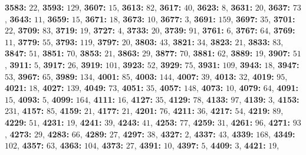 \textsf{\bfseries 3583:} $22$, \textsf{\bfseries 3593:} $129$, \textsf{\bfseries 3607:} $15$, \textsf{\bfseries 3613:} $82$, \textsf{\bfseries 3617:} $40$, \textsf{\bfseries 3623:} $8$, \textsf{\bfseries 3631:} $20$, \textsf{\bfseries 3637:} $73$, \textsf{\bfseries 3643:} $11$, \textsf{\bfseries 3659:} $15$, \textsf{\bfseries 3671:} $18$, \textsf{\bfseries 3673:} $10$, \textsf{\bfseries 3677:} $3$, \textsf{\bfseries 3691:} $159$, \textsf{\bfseries 3697:} $35$, \textsf{\bfseries 3701:} $22$, \textsf{\bfseries 3709:} $83$, \textsf{\bfseries 3719:} $19$, \textsf{\bfseries 3727:} $4$, \textsf{\bfseries 3733:} $20$, \textsf{\bfseries 3739:} $91$, \textsf{\bfseries 3761:} $6$, \textsf{\bfseries 3767:} $64$, \textsf{\bfseries 3769:} $11$, \textsf{\bfseries 3779:} $55$, \textsf{\bfseries 3793:} $119$, \textsf{\bfseries 3797:} $20$, \textsf{\bfseries 3803:} $43$, \textsf{\bfseries 3821:} $34$, \textsf{\bfseries 3823:} $21$, \textsf{\bfseries 3833:} $83$, \textsf{\bfseries 3847:} $51$, \textsf{\bfseries 3851:} $70$, \textsf{\bfseries 3853:} $21$, \textsf{\bfseries 3863:} $29$, \textsf{\bfseries 3877:} $70$, \textsf{\bfseries 3881:} $62$, \textsf{\bfseries 3889:} $19$, \textsf{\bfseries 3907:} $51$, \textsf{\bfseries 3911:} $5$, \textsf{\bfseries 3917:} $26$, \textsf{\bfseries 3919:} $101$, \textsf{\bfseries 3923:} $52$, \textsf{\bfseries 3929:} $75$, \textsf{\bfseries 3931:} $109$, \textsf{\bfseries 3943:} $18$, \textsf{\bfseries 3947:} $53$, \textsf{\bfseries 3967:} $65$, \textsf{\bfseries 3989:} $134$, \textsf{\bfseries 4001:} $85$, \textsf{\bfseries 4003:} $144$, \textsf{\bfseries 4007:} $39$, \textsf{\bfseries 4013:} $32$, \textsf{\bfseries 4019:} $95$, \textsf{\bfseries 4021:} $18$, \textsf{\bfseries 4027:} $139$, \textsf{\bfseries 4049:} $73$, \textsf{\bfseries 4051:} $35$, \textsf{\bfseries 4057:} $148$, \textsf{\bfseries 4073:} $10$, \textsf{\bfseries 4079:} $64$, \textsf{\bfseries 4091:} $15$, \textsf{\bfseries 4093:} $5$, \textsf{\bfseries 4099:} $164$, \textsf{\bfseries 4111:} $16$, \textsf{\bfseries 4127:} $35$, \textsf{\bfseries 4129:} $78$, \textsf{\bfseries 4133:} $97$, \textsf{\bfseries 4139:} $3$, \textsf{\bfseries 4153:} $231$, \textsf{\bfseries 4157:} $85$, \textsf{\bfseries 4159:} $21$, \textsf{\bfseries 4177:} $21$, \textsf{\bfseries 4201:} $76$, \textsf{\bfseries 4211:} $36$, \textsf{\bfseries 4217:} $54$, \textsf{\bfseries 4219:} $89$, \textsf{\bfseries 4229:} $51$, \textsf{\bfseries 4231:} $19$, \textsf{\bfseries 4241:} $39$, \textsf{\bfseries 4243:} $41$, \textsf{\bfseries 4253:} $77$, \textsf{\bfseries 4259:} $31$, \textsf{\bfseries 4261:} $96$, \textsf{\bfseries 4271:} $93$, \textsf{\bfseries 4273:} $29$, \textsf{\bfseries 4283:} $66$, \textsf{\bfseries 4289:} $27$, \textsf{\bfseries 4297:} $38$, \textsf{\bfseries 4327:} $2$, \textsf{\bfseries 4337:} $43$, \textsf{\bfseries 4339:} $168$, \textsf{\bfseries 4349:} $102$, \textsf{\bfseries 4357:} $63$, \textsf{\bfseries 4363:} $104$, \textsf{\bfseries 4373:} $27$, \textsf{\bfseries 4391:} $10$, \textsf{\bfseries 4397:} $5$, \textsf{\bfseries 4409:} $3$, \textsf{\bfseries 4421:} $19$, 
